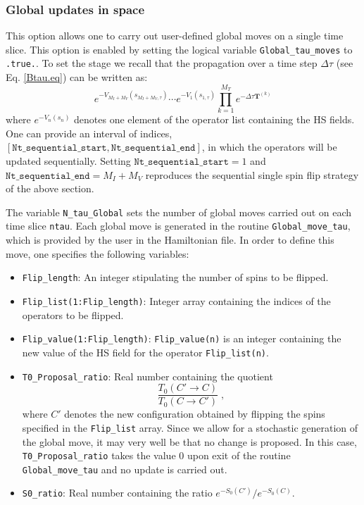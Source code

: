  
% 

\subsubsection{Global updates in space}
\label{sec:global_space}
This option allows one to carry out  user-defined global moves on a single time slice.  This option is enabled by setting the logical variable  \texttt{Global\_tau\_moves} to \texttt{.true.}.  To set the stage  we recall that the propagation over a time step $\Delta \tau$   (see Eq. \ref{Btau.eq}) can be  written as: 
\begin{equation}
	e^{-V_{M_I+M_V}(s_{M_I+M_V,\tau})}  \cdots e^{-V_{1}(s_{1,\tau})}  \prod_{k=1}^{M_T}   e^{-\Delta \tau {\bm T}^{(k)}}  
\end{equation}
where $e^{-V_{n}(s_{n})}$ denotes one element of the  operator list  containing the HS fields.  One can provide  an interval of indices, 
$ \left[ \texttt{Nt\_sequential\_start}, 
\texttt{Nt\_sequential\_end} \right] $,  in which the operators will be updated  sequentially. Setting $ \texttt{Nt\_sequential\_start} =1 $ and 
$ \texttt{Nt\_sequential\_end} = M_I+M_V$  reproduces the  sequential single spin flip strategy of the above section.

The variable \texttt{N\_tau\_Global}  sets the number of global moves carried out on each time slice \texttt{ntau}. Each global move is generated in the routine  \texttt{Global\_move\_tau}, which is provided by the user in the Hamiltonian file. In order to  define this move, one specifies the following variables: 
\begin{itemize}
\item \texttt{Flip\_length}:  An integer stipulating the  number of spins to be flipped.
\item \texttt{Flip\_list(1:Flip\_length)}:   Integer array containing the  indices of the operators to be flipped.
\item \texttt{Flip\_value(1:Flip\_length)}:  \texttt{Flip\_value(n)} is an  integer containing the new value of the  HS  field for the operator \texttt{Flip\_list(n)}.
\item  \texttt{T0\_Proposal\_ratio}:   Real number containing  the quotient
\begin{equation}
	 \frac{T_0(C' \rightarrow C)}{T_0(C \rightarrow C') }  \;, \label{T0_ratio}
\end{equation}
where $ C'$  denotes the new configuration  obtained by flipping the spins specified in the \texttt{Flip\_list}  array. 
Since we allow for a stochastic  generation of  the global move, it may very well be that no change is proposed. In this case, \texttt{T0\_Proposal\_ratio}   takes the value 0 upon exit of the routine \texttt{Global\_move\_tau} and  no update is carried out. 
\item \texttt{S0\_ratio}:   Real number containing  the ratio  $e^{-S_0(C')}/e^{-S_0(C)}$. 
\end{itemize}
